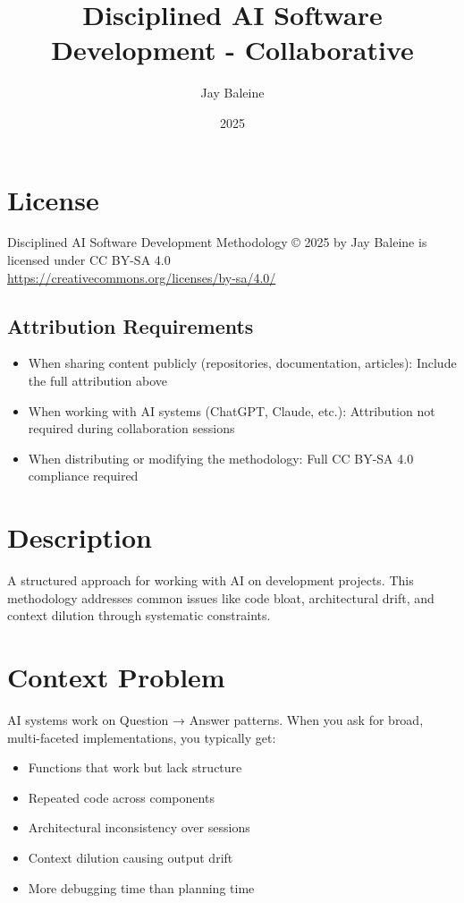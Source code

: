 \documentclass{article}
\title{Disciplined AI Software Development - Collaborative}
\author{Jay Baleine}
\date{2025}
\begin{document}
\maketitle

\section*{License}
Disciplined AI Software Development Methodology © 2025 by Jay Baleine is licensed under CC BY-SA 4.0 \\
\url{https://creativecommons.org/licenses/by-sa/4.0/}

\subsection*{Attribution Requirements}
\begin{itemize}[noitemsep]
\item When sharing content publicly (repositories, documentation, articles): Include the full attribution above
\item When working with AI systems (ChatGPT, Claude, etc.): Attribution not required during collaboration sessions
\item When distributing or modifying the methodology: Full CC BY-SA 4.0 compliance required
\end{itemize}

\section*{Description}
A structured approach for working with AI on development projects. This methodology addresses common issues like code bloat, architectural drift, and context dilution through systematic constraints.

\section{Context Problem}
AI systems work on Question → Answer patterns. When you ask for broad, multi-faceted implementations, you typically get:

\begin{itemize}[noitemsep]
\item Functions that work but lack structure
\item Repeated code across components
\item Architectural inconsistency over sessions
\item Context dilution causing output drift
\item More debugging time than planning time
\end{itemize}
\end{document}
